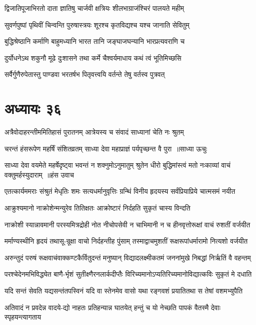 \twolineshloka
{द्विजातिपूजाभिरतो दाता ज्ञातिषु चार्जवी}
{क्षत्रियः शीलभाग्राजंश्चिरं पालयते महीम्}


\twolineshloka
{सुवर्णपुष्पां पृथिवीं चिन्वन्ति पुरुषास्त्रयः}
{शूरश्च कृतविद्यश्च यश्च जानाति सेवितुम्}


\twolineshloka
{बुद्धिश्रेष्ठानि कर्माणि बाहुमध्यानि भारत}
{तानि जङ्घाजघन्यानि भारप्रत्यवराणि च}


\twolineshloka
{दुर्योधनेऽथ शकुनौ मूढे दुःशासने तथा}
{कर्मे चैश्वर्यमाधाय कथं त्वं भूतिमिच्छसि}


\twolineshloka
{सर्वैर्गुणैरुपेतास्तु पाण्डवा भरतर्षभ}
{पितृवत्त्वयि वर्तन्ते तेषु वर्तस्व पुत्रवत्}


\chapter{अध्यायः ३६}
\twolineshloka
{अत्रैवोदाहरन्तीममितिहासं पुरातनम्}
{आत्रेयस्य च संवादं साध्यानां चेति नः श्रुतम्}


\threelineshloka
{चरन्तं हंसरूपेण महर्षिं संशितव्रतम्}
{साध्या देवा महाप्राज्ञं पर्यपृच्छन्त वै पुरा ॥साध्या ऊचुः}
{}


\threelineshloka
{साध्या देवा वयमेते महर्षेदृष्ट्वा भवन्तं न शक्नुमोऽनुमातुम्}
{श्रुतेन धीरो बुद्धिमांस्त्वं मतो नःकाव्यां वाचं वक्तुमर्हस्युदाराम् ॥हंस उवाच}
{}


\twolineshloka
{एतत्कार्यममराः संश्रुतं मेधृतिः शमः सत्यधर्मानुवृत्तिः}
{ग्रन्थिं विनीय हृदयस्य सर्वंप्रियाप्रिये चात्मसमं नयीत}


\twolineshloka
{आक्रुश्यमानो नाक्रोशेन्मन्युरेव तितिक्षतः}
{आक्रोष्टारं निर्दहति सुकृतं चास्य विन्दति}


\twolineshloka
{नाक्रोशी स्यान्नावमानी परस्यमित्रद्रोही नोत नीचोपसेवी}
{न चाभिमानी न च हीनवृत्तोरूक्षां वाचं रुशतीं वर्जयीत}


\twolineshloka
{मर्माण्यस्थीनि हृदयं तथासू-न्रूक्षा वाचो निर्दहन्तीह पुंसाम्}
{तस्माद्वाचमुशतीं रूक्षरूपांधर्मारामो नित्यशो वर्जयीत}


\twolineshloka
{अरुन्तुदं परुषं रूक्षवाचंवाक्कण्टकैर्वितुदन्तं मनुष्यान्}
{विद्यादलक्ष्मीकतमं जननांमुखे निबद्धां निर्ऋतिं वै वहन्तम्}


\twolineshloka
{परश्चेदेनमभिविद्ध्येत बाणै-र्भृशं सुतीक्ष्णैरनलार्कदीप्तैः}
{विरिच्यमानोऽप्यतिरिच्यमानोविद्यात्कविः सुकृतं मे दधाति}


\twolineshloka
{यदि सन्तं सेवति यद्यसन्तंतपस्विनं यदि वा स्तेनमेव}
{वासो यथा रङ्गवशं प्रयातितथा स तेषां वशमभ्युपैति}


\twolineshloka
{अतिवादं न प्रवदेन्न वादये-द्यो नाहतः प्रतिहन्यान्न घातयेत्}
{हन्तुं च यो नेच्छति पापकं वैतस्मै देवाः स्पृहयन्त्यागताय}


